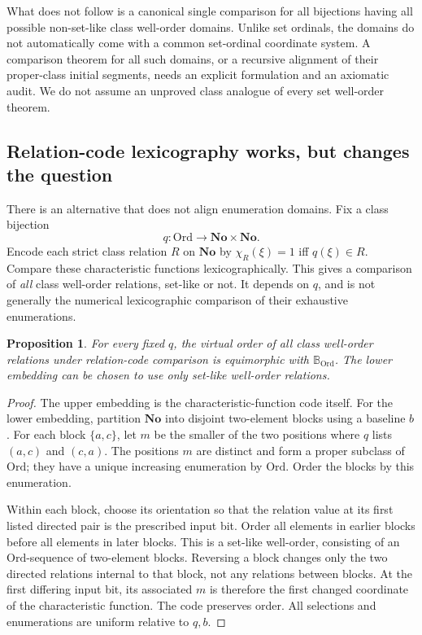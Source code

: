 \documentclass[11pt]{article}
\newtheorem{proposition}[proposition]{Proposition}
\theoremstyle{definition}
\theoremstyle{remark}
\newcommand{\No}{\mathbf{No}}
\newcommand{\Ord}{\mathrm{Ord}}
\newcommand{\B}{\mathbb B}
\begin{document}
What does not follow is a canonical single comparison for all
bijections having all possible non-set-like class well-order domains.
Unlike set ordinals, the domains do not automatically come with a
common set-ordinal coordinate system. A comparison theorem for all
such domains, or a recursive alignment of their proper-class initial
segments, needs an explicit formulation and an axiomatic audit. We do
not assume an unproved class analogue of every set well-order theorem.

\subsection{Relation-code lexicography works, but changes the question}

There is an alternative that does not align enumeration domains.
Fix a class bijection
\[
                         q:\Ord\longrightarrow\No\times\No.
\]
Encode each strict class relation $R$ on $\No$ by
$\chi_R(\xi)=1$ iff $q(\xi)\in R$. Compare these characteristic
functions lexicographically. This gives a comparison of \emph{all}
class well-order relations, set-like or not. It depends on $q$, and is
not generally the numerical lexicographic comparison of their
exhaustive enumerations.

\begin{proposition}\label{swo:sk:prop:relationcode}
For every fixed $q$, the virtual order of all class well-order
relations under relation-code comparison is equimorphic with
$\B_{\Ord}$. The lower embedding can be chosen to use only set-like
well-order relations.
\end{proposition}
\begin{proof}
The upper embedding is the characteristic-function code itself.
For the lower embedding, partition $\No$ into disjoint two-element
blocks using a baseline $b$. For each block $\{a,c\}$, let $m$ be the
smaller of the two positions where $q$ lists $(a,c)$ and $(c,a)$.
The positions $m$ are distinct and form a proper subclass of $\Ord$;
they have a unique increasing enumeration by $\Ord$. Order the blocks
by this enumeration.

Within each block, choose its orientation so that the relation value
at its first listed directed pair is the prescribed input bit. Order
all elements in earlier blocks before all elements in later blocks.
This is a set-like well-order, consisting of an $\Ord$-sequence of
two-element blocks. Reversing a block changes only the two directed
relations internal to that block, not any relations between blocks.
At the first differing input bit, its associated $m$ is therefore the
first changed coordinate of the characteristic function. The code
preserves order. All selections and enumerations are uniform relative
to $q,b$.
\end{proof}
\end{document}
